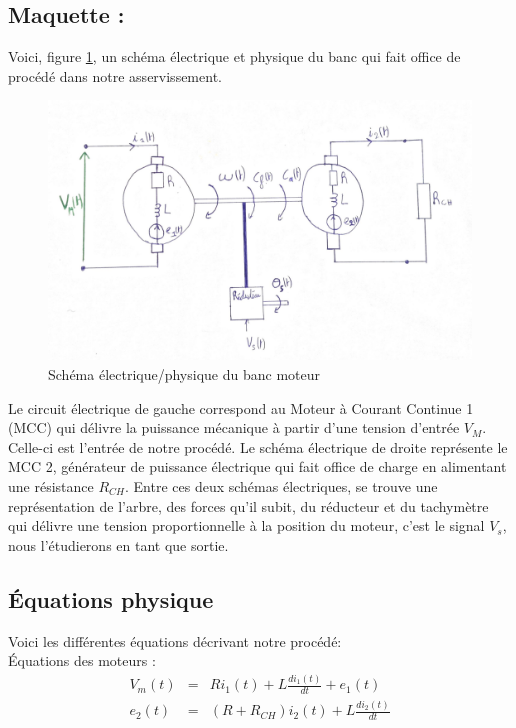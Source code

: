 \subsection{Maquette :}
Voici, figure \ref{fig:schema0}, un schéma électrique et physique du banc qui fait office de procédé dans notre asservissement.
\begin{figure}[!ht]
\centering
\includegraphics[width=.8\textwidth]{./I/images/schema0.png}
\caption{\label{fig:schema0}Schéma électrique/physique du banc moteur}
\end{figure}
Le circuit électrique de gauche correspond au Moteur à Courant Continue 1 (MCC) qui délivre la puissance mécanique à partir d'une tension d'entrée $V_M$. Celle-ci est l'entrée de notre procédé. Le schéma électrique de droite représente le MCC 2, générateur de puissance électrique qui fait office de charge en alimentant une résistance $R_{CH}$. Entre ces deux schémas électriques, se trouve une représentation de l'arbre, des forces qu'il subit, du réducteur et du tachymètre qui délivre une tension proportionnelle à la position du moteur, c'est le signal $V_s$, nous l'étudierons en tant que sortie. 

\subsection{Équations physique}
Voici les différentes équations décrivant notre procédé:\\
\noindent\hspace{3mm}\textbullet  \hspace{1mm} Équations des moteurs :
\begin{eqnarray}
V_m(t)  					&=& 	R i_1(t) + L \frac{d   i_1(t)}{d t} + e_1(t) \\
e_2(t) 						&=& 	(R+R_{CH}) i_2(t) + L \frac{d i_2(t)}{d t}
\end{eqnarray}


